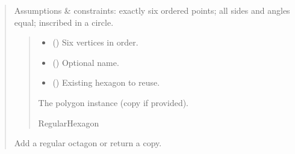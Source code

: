 \documentclass[letterpaper,10pt,english]{sphinxmanual}
\begin{document}
\begin{quote}
\begin{fulllineitems}
\begin{fulllineitems}
\sphinxAtStartPar
Assumptions \& constraints: exactly six ordered points; all sides and
angles equal; inscribed in a circle.
\begin{quote}\begin{description}
\begin{itemize}
\item {} 
\sphinxAtStartPar
{} () \textendash{} Six vertices in order.

\item {} 
\sphinxAtStartPar
{} (\sphinxstyleliteralemphasis{\sphinxupquote{ | }}) \textendash{} Optional name.

\item {} 
\sphinxAtStartPar
{} (\sphinxstyleliteralemphasis{\sphinxupquote{ | }}) \textendash{} Existing hexagon to reuse.

\end{itemize}

\sphinxAtStartPar
The polygon instance (copy if provided).

\sphinxAtStartPar
RegularHexagon

\end{description}\end{quote}

\end{fulllineitems}


\begin{fulllineitems}
\label{\detokenize{pygeox:pygeox.add_objects.AddNamespace.regular_octagon}}
\pysigstartsignatures
\pysiglinewithargsret
{}
{\sphinxparamcomma {}\sphinxparamcomma {}}
{}
\pysigstopsignatures
\sphinxAtStartPar
Add a regular octagon or return a copy.


\end{fulllineitems}
\end{fulllineitems}
\end{quote}
\end{document}
